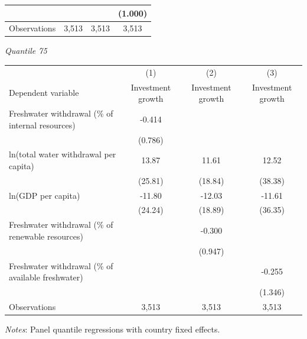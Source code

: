 \begin{table}[htbp]
\begin{tabular}{lccc}
 &  &  & (1.000) \\
\hline
Observations & 3,513 & 3,513 & 3,513 \\
\hline
\end{tabular}
\vspace{0.75em}
\textit{Quantile 75}\\
\begin{tabular}{lccc}
\hline
 & (1) & (2) & (3) \\
Dependent variable & Investment growth & Investment growth & Investment growth \\
\hline
Freshwater withdrawal (\% of internal resources) & -0.414 &  &  \\
 & (0.786) &  &  \\
ln(total water withdrawal per capita) & 13.87 & 11.61 & 12.52 \\
 & (25.81) & (18.84) & (38.38) \\
ln(GDP per capita) & -11.80 & -12.03 & -11.61 \\
 & (24.24) & (18.89) & (36.35) \\
Freshwater withdrawal (\% of renewable resources) &  & -0.300 &  \\
 &  & (0.947) &  \\
Freshwater withdrawal (\% of available freshwater) &  &  & -0.255 \\
 &  &  & (1.346) \\
\hline
Observations & 3,513 & 3,513 & 3,513 \\
\hline
\end{tabular}
\vspace{0.5em}
\parbox{0.95\textwidth}{\footnotesize \textit{Notes}: Panel quantile regressions with country fixed effects.}
\end{table}
